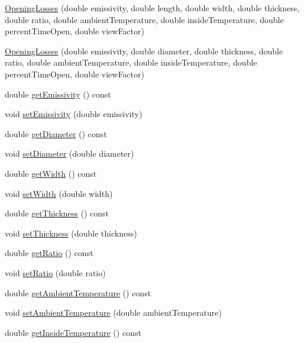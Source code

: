\begin{DoxyCompactItemize}
\item 
\hyperlink{class_opening_losses_a74205733c9a9b328bd9bf15c73841a8f}{Opening\+Losses} (double emissivity, double length, double width, double thickness, double ratio, double ambient\+Temperature, double inside\+Temperature, double percent\+Time\+Open, double view\+Factor)
\item 
\hyperlink{class_opening_losses_af5406c6281fda46406456cdaa9d948fa}{Opening\+Losses} (double emissivity, double diameter, double thickness, double ratio, double ambient\+Temperature, double inside\+Temperature, double percent\+Time\+Open, double view\+Factor)
\item 
double \hyperlink{class_opening_losses_a7eaf8e68f268e8ff1671c5f9f0462b4f}{get\+Emissivity} () const
\item 
void \hyperlink{class_opening_losses_aa63eb1c2ba9057d401f3a7f5dd974afe}{set\+Emissivity} (double emissivity)
\item 
double \hyperlink{class_opening_losses_a8ed643300b0f5b606be6cd669cd413c3}{get\+Diameter} () const
\item 
void \hyperlink{class_opening_losses_ab840ba51788e83c0b1dc9b8c05b1eadb}{set\+Diameter} (double diameter)
\item 
double \hyperlink{class_opening_losses_a0374aeac5532188358b5f6ad0f120305}{get\+Width} () const
\item 
void \hyperlink{class_opening_losses_a5ee8c514917c16ecd2c63caecc98e1c6}{set\+Width} (double width)
\item 
double \hyperlink{class_opening_losses_aeefdf4431056de65ca84c6dfb24b61e1}{get\+Thickness} () const
\item 
void \hyperlink{class_opening_losses_a221cc88072e4f0975f15c6cd96781dea}{set\+Thickness} (double thickness)
\item 
double \hyperlink{class_opening_losses_ac9f7dbd2cc023932b5d8076a21a3f690}{get\+Ratio} () const
\item 
void \hyperlink{class_opening_losses_aab7f82f24511c37f0bc4b29cbc7239b5}{set\+Ratio} (double ratio)
\item 
double \hyperlink{class_opening_losses_a198f46508744d6943846ea95a9513a45}{get\+Ambient\+Temperature} () const
\item 
void \hyperlink{class_opening_losses_a3624c9fad2a413871b7324f7e957a5ae}{set\+Ambient\+Temperature} (double ambient\+Temperature)
\item 
double \hyperlink{class_opening_losses_abe930dab77b1c855503ee51fdf66c88a}{get\+Inside\+Temperature} () const
\item 

\end{DoxyCompactItemize}
